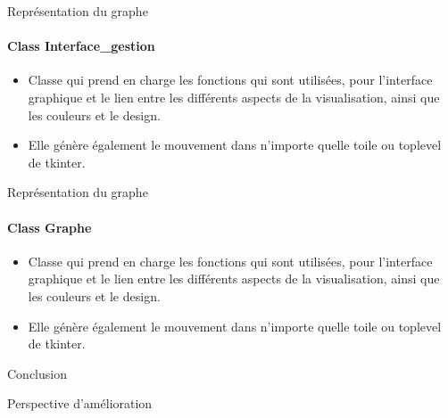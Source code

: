\documentclass{beamer}
\begin{document}
\begin{frame}{Représentation du graphe}
\framesubtitle{Class Interface\_gestion}
\begin{itemize}
\item Classe qui prend en charge les fonctions qui sont utilisées, pour l’interface graphique et le lien entre les différents aspects de la visualisation, ainsi que les couleurs et le design. 

\item Elle génère également le mouvement dans n’importe quelle toile ou toplevel de tkinter.
\end{itemize}

\end{frame}




\begin{frame}{Représentation du graphe}
\framesubtitle{Class Graphe}
\begin{itemize}
\item Classe qui prend en charge les fonctions qui sont utilisées, pour l’interface graphique et le lien entre les différents aspects de la visualisation, ainsi que les couleurs et le design. 

\item Elle génère également le mouvement dans n’importe quelle toile ou toplevel de tkinter.
\end{itemize}

\end{frame}


\begin{frame}{Conclusion}

\end{frame}


\begin{frame}{Perspective d'amélioration}

\end{frame}
\end{document}
